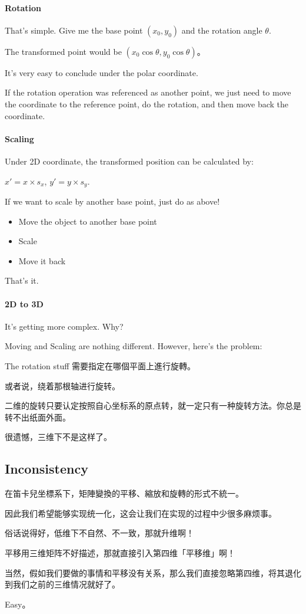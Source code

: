 \documentclass[
]{article}
\begin{document}
\hypertarget{header-n61}{%
\paragraph{Rotation}\label{header-n61}}

That's simple. Give me the base point \((x_0, y_0)\) and the rotation
angle \(\theta\).

The transformed point would be \((x_0\cos\theta, y_0\cos\theta)\)。

It's very easy to conclude under the polar coordinate.

If the rotation operation was referenced as another point, we just need
to move the coordinate to the reference point, do the rotation, and then
move back the coordinate.

\hypertarget{header-n66}{%
\paragraph{Scaling}\label{header-n66}}

Under 2D coordinate, the transformed position can be calculated by:

\(x' = x \times s_x\), \(y' = y \times s_y\).

If we want to scale by another base point, just do as above!

\begin{itemize}
\item
  Move the object to another base point
\item
  Scale
\item
  Move it back
\end{itemize}

That's it.

\hypertarget{header-n78}{%
\paragraph{2D to 3D}\label{header-n78}}

It's getting more complex. Why?

Moving and Scaling are nothing different. However, here's the problem:

The rotation stuff 需要指定在哪個平面上進行旋轉。

或者说，绕着那根轴进行旋转。

二维的旋转只要认定按照自心坐标系的原点转，就一定只有一种旋转方法。你总是转不出纸面外面。

很遗憾，三维下不是这样了。

\hypertarget{header-n85}{%
\subsection{Inconsistency}\label{header-n85}}

在笛卡兒坐標系下，矩陣變換的平移、縮放和旋轉的形式不統一。

因此我们希望能够实现统一化，这会让我们在实现的过程中少很多麻烦事。

俗话说得好，低维下不自然、不一致，那就升维啊！

平移用三维矩阵不好描述，那就直接引入第四维「平移维」啊！

当然，假如我们要做的事情和平移没有关系，那么我们直接忽略第四维，将其退化到我们之前的三维情况就好了。

Easy。
\end{document}
